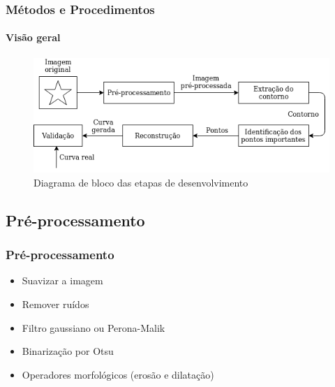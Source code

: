 \begin{frame}
\frametitle{Métodos e Procedimentos}
\framesubtitle{Visão geral}

\begin{figure}[hbt]
	\begin{center}
		\caption{Diagrama de bloco das etapas de desenvolvimento}
		\includegraphics[width=1\textwidth]{img/diagrama.png}
	\end{center}
\end{figure}

\end{frame}

\subsection{Pré-processamento}

\begin{frame}
\frametitle{Pré-processamento}

\begin{itemize}
\item Suavizar a imagem
\item Remover ruídos
\end{itemize}

\bigskip
{}
\begin{itemize}
	\item Filtro gaussiano ou Perona-Malik
	\item Binarização por Otsu
	\item Operadores morfológicos (erosão e dilatação)
\end{itemize}
\end{frame}

